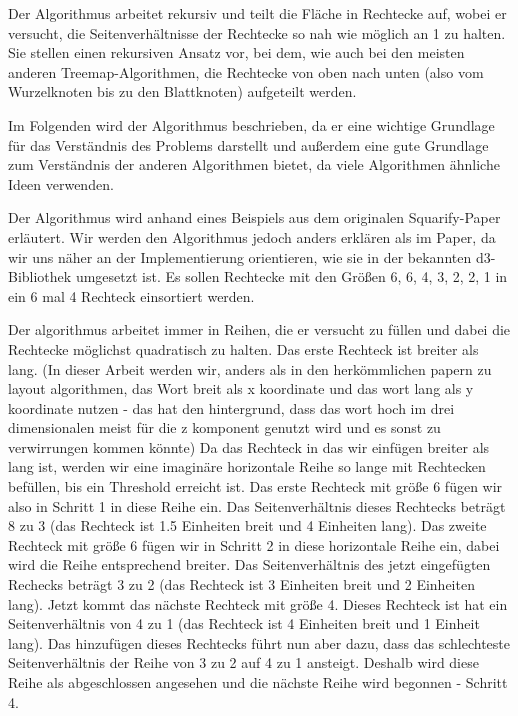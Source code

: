 Der Algorithmus arbeitet rekursiv und teilt die Fläche in Rechtecke auf, wobei er versucht, die Seitenverhältnisse der Rechtecke so nah wie möglich an 1 zu halten. Sie stellen einen rekursiven Ansatz vor, bei dem, wie auch bei den meisten anderen Treemap-Algorithmen, die Rechtecke von oben nach unten (also vom Wurzelknoten bis zu den Blattknoten) aufgeteilt werden.

Im Folgenden wird der Algorithmus beschrieben, da er eine wichtige Grundlage für das Verständnis des Problems darstellt und außerdem eine gute Grundlage zum Verständnis der anderen Algorithmen bietet, da viele Algorithmen ähnliche Ideen verwenden.

Der Algorithmus wird anhand eines Beispiels aus dem originalen Squarify-Paper \cite[5]{bruls2000squarified} erläutert. Wir werden den Algorithmus jedoch anders erklären als im Paper, da wir uns näher an der Implementierung orientieren, wie sie in der bekannten d3-Bibliothek \cite{d3_treemap_code} umgesetzt ist.
Es sollen Rechtecke mit den Größen 6, 6, 4, 3, 2, 2, 1 in ein 6 mal 4 Rechteck einsortiert werden.

Der algorithmus arbeitet immer in Reihen, die er versucht zu füllen und dabei die Rechtecke möglichst quadratisch zu halten. Das erste Rechteck ist breiter als lang. (In dieser Arbeit werden wir, anders als in den herkömmlichen papern zu layout algorithmen, das Wort breit als x koordinate und das wort lang als y koordinate nutzen - das hat den hintergrund, dass das wort hoch im drei dimensionalen meist für die z komponent genutzt wird und es sonst zu verwirrungen kommen könnte)
Da das Rechteck in das wir einfügen breiter als lang ist, werden wir eine imaginäre horizontale Reihe so lange mit Rechtecken befüllen, bis ein Threshold erreicht ist. Das erste Rechteck mit größe 6 fügen wir also in Schritt 1 in diese Reihe ein. Das Seitenverhältnis dieses Rechtecks beträgt 8 zu 3 (das Rechteck ist 1.5 Einheiten breit und 4 Einheiten lang). Das zweite Rechteck mit größe 6 fügen wir in Schritt 2 in diese horizontale Reihe ein, dabei wird die Reihe entsprechend breiter. Das Seitenverhältnis des jetzt eingefügten Rechecks beträgt 3 zu 2 (das Rechteck ist 3 Einheiten breit und 2 Einheiten lang). Jetzt kommt das nächste Rechteck mit größe 4. Dieses Rechteck ist hat ein Seitenverhältnis von 4 zu 1 (das Rechteck ist 4 Einheiten breit und 1 Einheit lang). Das hinzufügen dieses Rechtecks führt nun aber dazu, dass das schlechteste Seitenverhältnis der Reihe von 3 zu 2 auf 4 zu 1 ansteigt. Deshalb wird diese Reihe als abgeschlossen angesehen und die nächste Reihe wird begonnen - Schritt 4. 

